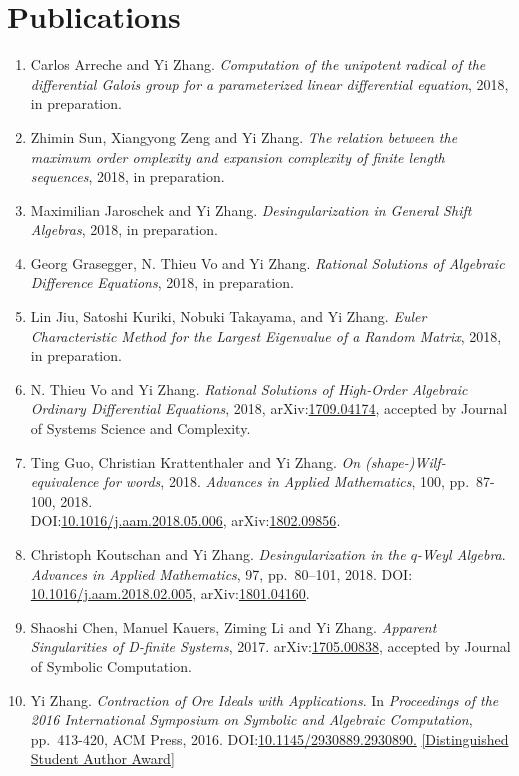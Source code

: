 \documentclass[a4paper,12pt]{article}
\begin{document}
\section*{\Large{Publications}}
\begin{enumerate}
\item Carlos Arreche and Yi Zhang.
{\em Computation of the unipotent radical of the differential Galois group for a parameterized linear differential equation}, 2018, in preparation. 
\item Zhimin Sun,  Xiangyong Zeng and Yi Zhang. 
{\em The relation between the maximum order
omplexity and expansion complexity of finite length sequences}, 2018, in preparation.
\item Maximilian Jaroschek and Yi Zhang. 
{\em Desingularization in General Shift Algebras}, 2018, in preparation.
\item Georg Grasegger, N. Thieu Vo and Yi Zhang. 
{\em Rational Solutions of Algebraic Difference Equations}, 2018, in preparation.
\item Lin Jiu, Satoshi Kuriki, Nobuki Takayama, and Yi Zhang. 
 {\em Euler Characteristic Method for the Largest Eigenvalue of a Random Matrix}, 2018, in preparation.
 \item N. Thieu Vo and Yi Zhang. {\em Rational Solutions of High-Order Algebraic Ordinary Differential Equations}, 2018, 
 arXiv:\href{https://arxiv.org/abs/1709.04174}{1709.04174}, accepted by Journal of Systems Science and Complexity.
\item Ting Guo, Christian Krattenthaler and Yi Zhang.
{\em On (shape-)Wilf-equivalence for words}, 2018.
{\em  Advances in Applied Mathematics}, 100, pp.\ 87-100, 2018. \\
DOI:\href{https://doi.org/10.1016/j.aam.2018.05.006}{10.1016/j.aam.2018.05.006}, 
arXiv:\href{https://arxiv.org/pdf/1802.09856.pdf}{1802.09856}.
\item Christoph Koutschan and Yi Zhang. {\em Desingularization in the $q$-Weyl Algebra}. 
{\em Advances in Applied Mathematics}, 97, pp.\ 80–101, 2018. 
DOI: \href{http://dx.doi.org/10.1016/j.aam.2018.02.005}{10.1016/j.aam.2018.02.005},
arXiv:\href{https://arxiv.org/abs/1801.04160}{1801.04160}.   
\item Shaoshi Chen, Manuel Kauers, Ziming Li and Yi Zhang. {\em Apparent Singularities of D-finite Systems}, 2017. 
 arXiv:\href{http://arxiv.org/abs/1705.00838}{1705.00838}, accepted by Journal of Symbolic Computation.
\item Yi Zhang. {\em Contraction of Ore Ideals with Applications}. 
In {\em Proceedings of the 2016 International Symposium on Symbolic and Algebraic Computation}, 
pp.\ 413-420, ACM Press, 2016. DOI:\href{http://dl.acm.org/citation.cfm?id=2930890}{10.1145/2930889.2930890.} 
\href{https://www.sigsam.org/Awards/ISSACAwards.html}{[Distinguished Student Author Award]}
\end{enumerate}
\end{document}
